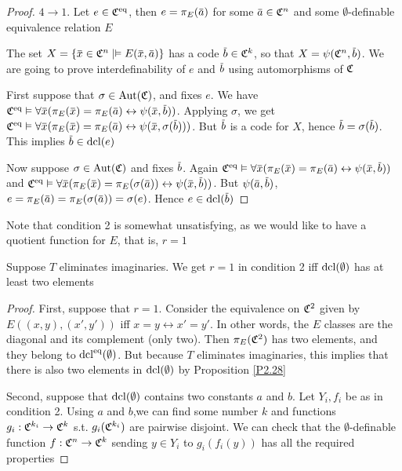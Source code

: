 \documentclass[11pt]{article}
\begin{document}
\begin{proof}
\(4\to 1\). Let \(e\in \mathfrak{C}^{\operatorname{eq}}\), then \(e=\pi_E(\bara)\) for some \(\bara\in \fC^n\) and
some \(\emptyset\)-definable equivalence relation \(E\)

The set \(X=\{\barx\in\fC^n\mid\vDash E(\barx,\bara)\}\) has a code \(\barb\in\fC^k\), so
that \(X=\psi(\fC^n,\barb)\). We are going to prove interdefinability of \(e\) and \(\barb\) using
automorphisms of \(\mathfrak{C}\)

First suppose that \(\sigma\in\operatorname{\text{Aut}}(\mathfrak{C})\), and fixes \(e\). We
have \(\fC^{\eq}\vDash\forall\barx(\pi_E(\barx)=\pi_E(\bara)\leftrightarrow\psi(\barx,\barb))\). Applying \(\sigma\), we
get \(\fC^{\eq}\vDash\forall\barx(\pi_E(\barx)=\pi_E(\bara)\leftrightarrow\psi(\barx,\sigma(\barb)))\). But \(\barb\) is a code
for \(X\), hence \(\barb=\sigma(\barb)\). This implies \(\barb\in\dcl(e)\)

Now suppose \(\sigma\in\operatorname{\text{Aut}}(\mathfrak{C})\) and fixes \(\barb\).
Again \(\fC^{\eq}\vDash\forall\barx(\pi_E(\barx)=\pi_E(\bara)\leftrightarrow\psi(\barx,\barb))\)
and \(\fC^{\eq}\vDash\forall\barx(\pi_E(\barx)=\pi_E(\sigma(\bara))\leftrightarrow\psi(\barx,\barb))\).
But \(\psi(\bara,\barb)\), \(e=\pi_E(\bara)=\pi_E(\sigma(\bara))=\sigma(e)\). Hence \(e\in\dcl(\barb)\)
\end{proof}

Note that condition 2 is somewhat unsatisfying, as we would like to have a quotient function
for \(E\), that is, \(r=1\)

\begin{proposition}[]
Suppose \(T\) eliminates imaginaries. We get \(r=1\) in condition 2 iff \(\operatorname{dcl}(\emptyset)\) has at least
two elements
\end{proposition}

\begin{proof}
First, suppose that \(r=1\). Consider the equivalence on \(\mathfrak{C}^2\) given by \(E((x,y),(x',y'))\)
iff \(x=y\leftrightarrow x'=y'\). In other words, the \(E\) classes are the diagonal and its complement (only
two). Then \(\pi_E(\mathfrak{C}^2)\) has two elements, and they belong to \(\operatorname{dcl}^{\operatorname{eq}}(\emptyset)\). But because \(T\)
eliminates imaginaries, this implies that there is also two elements in \(\operatorname{dcl}(\emptyset)\) by
Proposition \ref{P2.28}

Second, suppose that \(\operatorname{dcl}(\emptyset)\) contains two constants \(a\) and \(b\). Let \(Y_i,f_i\) be as in
condition 2. Using \(a\) and \(b\),we can find some number \(k\) and functions \(g_i:\mathfrak{C}^{k_i}\to\mathfrak{C}^k\)
s.t. \(g_i(\mathfrak{C}^{k_i})\) are pairwise disjoint. We can check that the \(\emptyset\)-definable
function \(f:\mathfrak{C}^n\to\mathfrak{C}^k\) sending \(y\in Y_i\) to \(g_i(f_i(y))\) has all the required properties
\end{proof}
\end{document}
